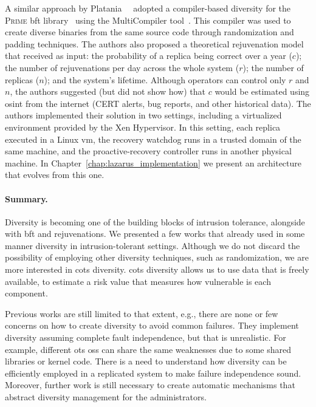 A similar approach by Platania~\etal{}~\cite{Platania:2014} adopted a compiler-based diversity for the \textsc{Prime} \gls{bft} library~\cite{Amir:2011} using the MultiCompiler tool~\cite{Homescu:2013}.
This compiler was used to create diverse binaries from the same source code through randomization and padding techniques.
The authors also proposed a theoretical rejuvenation model that received as input: the probability of a replica being correct over a year ($c$); the number of rejuvenations per day across the whole system ($r$); the number of replicas ($n$); and the system's lifetime. 
Although operators can control only $r$ and $n$, the authors suggested (but did not show how) that $c$ would be estimated using \gls{osint} from the internet (CERT alerts, bug reports, and other historical data).
The authors implemented their solution in two settings, including a virtualized environment provided by the Xen Hypervisor.
In this setting, each replica executed in a Linux \gls{vm}, the recovery watchdog runs in a trusted domain of the same machine, and the proactive-recovery controller runs in another physical machine. In Chapter~\ref{chap:lazarus_implementation} we present an architecture that evolves from this one.


\paragraph{Summary.} 
Diversity is becoming one of the building blocks of intrusion tolerance, alongside with \gls{bft} and rejuvenations. 
We presented a few works that already used in some manner diversity in intrusion-tolerant settings. 
Although we do not discard the possibility of employing other diversity techniques, such as randomization, we are more interested in \gls{cots} diversity.
\gls{cots} diversity allows us to use data that is freely available, to estimate a risk value that measures how vulnerable is each component. 

Previous works are still limited to that extent, e.g., there are none or few concerns on how to create diversity to avoid common failures. 
They implement diversity assuming complete fault independence, but that is unrealistic. 
For example, different \gls{ots} \glspl{os} can share the same weaknesses due to some shared libraries or kernel code. 
There is a need to understand how diversity can be efficiently employed in a replicated system to make failure independence sound. 
Moreover, further work is still necessary to create automatic mechanisms that abstract diversity management for the administrators.



